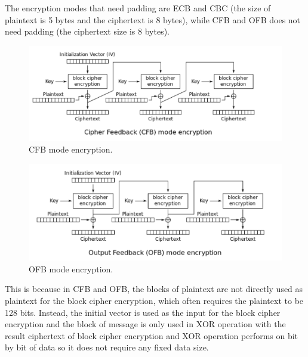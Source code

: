 \documentclass{article}
\begin{document}
\begin{enumerate}
        The encryption modes that need padding are ECB and CBC (the size of
        plaintext is 5 bytes and the ciphertext is 8 bytes), while CFB and
        OFB does not need padding (the ciphertext size is 8 bytes).

        \begin{figure}[!ht]
            \centering
            \includegraphics[scale=0.8]{task04_cfb.png}
            \caption{CFB mode encryption.\protect\footnotemark}
        \end{figure}


        \begin{figure}[!ht]
            \centering
            \includegraphics[scale=0.8]{task04_ofb.png}
            \caption{OFB mode encryption.\protect\footnotemark}
        \end{figure}


        This is because in CFB and OFB, the blocks of plaintext are not directly
        used as plaintext for the block cipher encryption, which often requires
        the plaintext to be 128 bits. Instead, the initial vector is used as the
        input for the block cipher encryption and the block of message is only
        used in XOR operation with the result ciphertext of block cipher encryption
        and XOR operation performs on bit by bit of data so it does not require
        any fixed data size.


\end{enumerate}
\end{document}
